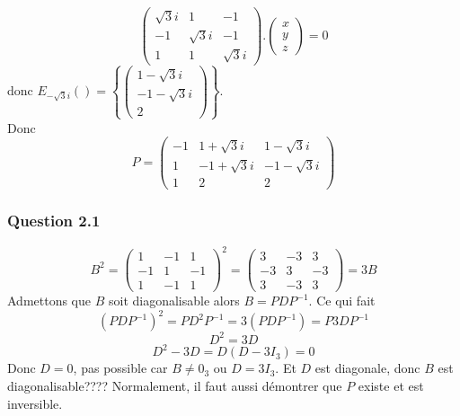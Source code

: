 \documentclass[]{book}
\theoremstyle{definition}
\begin{document}
$$\begin{pmatrix} \sqrt{3}i & 1 & -1 \\-1 & \sqrt{3}i & -1 \\1 & 1 & \sqrt{3}i\end{pmatrix} . \begin{pmatrix} x \\ y\\z \end{pmatrix} = 0$$
donc $E_{-\sqrt{3}i}()=\left\{ \begin{pmatrix} 1-\sqrt{3}i \\ -1-\sqrt{3}i\\2 \end{pmatrix} \right\} $.\\
Donc
$$P=\begin{pmatrix}-1&1+\sqrt{3}i&1-\sqrt{3}i\\ 1&-1+\sqrt{3}i&-1-\sqrt{3}i\\ 1&2&2\end{pmatrix}$$

\subsubsection*{Question 2.1}
$$B^2 = \begin{pmatrix}1&-1&1\\ -1&1&-1\\ 1&-1&1\end{pmatrix}^2 = \begin{pmatrix}3&-3&3\\ -3&3&-3\\ 3&-3&3\end{pmatrix} = 3B$$ 
Admettons que $B$ soit diagonalisable alors $B=PDP^{-1}$. Ce qui fait
$$(PDP^{-1})^2 = PD^2P^{-1}= 3(PDP^{-1}) = P3DP^{-1}$$
$$D^2=3D$$
$$D^2-3D = D(D-3I_3) = 0$$
Donc $D=0$, pas possible car $B \neq 0_3$ ou $D=3I_3$. Et $D$ est diagonale, donc $B$ est diagonalisable???? Normalement, il faut aussi d\'emontrer que $P$ existe et est inversible.
\end{document}
